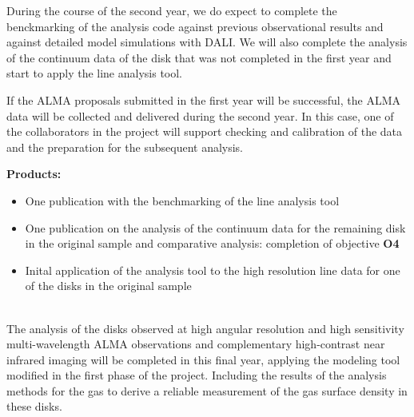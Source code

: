 \documentclass[10pt,fleqn,twoside]{article}
\begin{document}
During the course of the second year, we do expect to complete the benckmarking of the analysis code against previous observational results and against detailed model simulations with DALI. 
We will also complete the analysis of the continuum data of the disk that was not completed in the first year and start to apply the line analysis tool.

If the ALMA proposals submitted in the first year will be successful, the ALMA data will be collected and delivered during the second year. In this case, one of the collaborators in the project will support checking and calibration of the data and the preparation for the subsequent analysis. 

\smallskip
{\bf Products:} 
\begin{itemize}
\item One publication with the benchmarking of the line analysis tool
\item One publication on the analysis of the continuum data for the remaining disk in the original sample and comparative analysis: completion of objective {\bf O4}
\item Inital application of the analysis tool to the high resolution line data for one of the disks in the original sample
\end{itemize}

\vspace{1em}{\Tcol\bf Months 25-36}\\
The analysis of the disks observed at high angular resolution and high sensitivity multi-wavelength ALMA observations and complementary high-contrast near infrared imaging will be completed in this final year, applying the modeling tool modified in the first phase of the project. Including the results of the analysis
methods for the gas to derive a reliable measurement of the gas surface density in these disks. 
\end{document}
